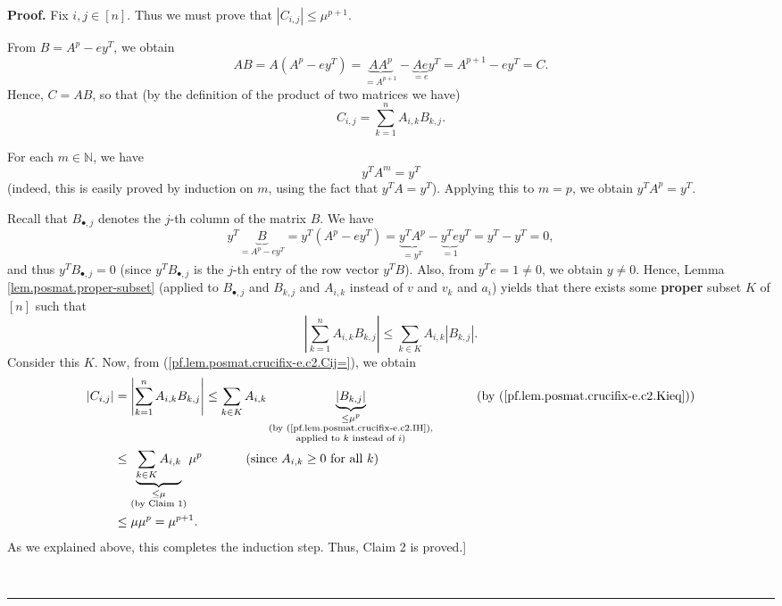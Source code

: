 \documentclass[numbers=enddot,12pt,final,onecolumn,notitlepage]{scrartcl}%
\numberwithin{exer}{subsection}
\theoremstyle{definition}
\newenvironment{proof}[1][Proof]{\noindent\textbf{#1.} }{\ \rule{0.5em}{0.5em}}
\let\sumnonlimits\sum
\renewcommand{\sum}{\sumnonlimits\limits}
\begin{document}
\begin{proof}
Fix $i,j\in\left[  n\right]  $. Thus we must prove that $\left\vert
C_{i,j}\right\vert \leq\mu^{p+1}$.

From $B=A^{p}-ey^{T}$, we obtain%
\[
AB=A\left(  A^{p}-ey^{T}\right)  =\underbrace{AA^{p}}_{=A^{p+1}}%
-\underbrace{Ae}_{=e}y^{T}=A^{p+1}-ey^{T}=C.
\]
Hence, $C=AB$, so that (by the definition of the product of two matrices we
have)%
\begin{equation}
C_{i,j}=\sum_{k=1}^{n}A_{i,k}B_{k,j}. \label{pf.lem.posmat.crucifix-e.c2.Cij=}%
\end{equation}


For each $m\in\mathbb{N}$, we have
\[
y^{T}A^{m}=y^{T}%
\]
(indeed, this is easily proved by induction on $m$, using the fact that
$y^{T}A=y^{T}$). Applying this to $m=p$, we obtain $y^{T}A^{p}=y^{T}$.

Recall that $B_{\bullet,j}$ denotes the $j$-th column of the matrix $B$. We
have%
\[
y^{T}\underbrace{B}_{=A^{p}-ey^{T}}=y^{T}\left(  A^{p}-ey^{T}\right)
=\underbrace{y^{T}A^{p}}_{=y^{T}}-\underbrace{y^{T}e}_{=1}y^{T}=y^{T}%
-y^{T}=0,
\]
and thus $y^{T}B_{\bullet,j}=0$ (since $y^{T}B_{\bullet,j}$ is the $j$-th
entry of the row vector $y^{T}B$). Also, from $y^{T}e=1\neq0$, we obtain
$y\neq0$. Hence, Lemma \ref{lem.posmat.proper-subset} (applied to
$B_{\bullet,j}$ and $B_{k,j}$ and $A_{i,k}$ instead of $v$ and $v_{k}$ and
$a_{i}$) yields that there exists some \textbf{proper} subset $K$ of $\left[
n\right]  $ such that%
\begin{equation}
\left\vert \sum_{k=1}^{n}A_{i,k}B_{k,j}\right\vert \leq\sum_{k\in K}%
A_{i,k}\left\vert B_{k,j}\right\vert .
\label{pf.lem.posmat.crucifix-e.c2.Kieq}%
\end{equation}
Consider this $K$. Now, from (\ref{pf.lem.posmat.crucifix-e.c2.Cij=}), we
obtain%
\begin{align*}
\left\vert C_{i,j}\right\vert  &  =\left\vert \sum_{k=1}^{n}A_{i,k}%
B_{k,j}\right\vert \leq\sum_{k\in K}A_{i,k}\underbrace{\left\vert
B_{k,j}\right\vert }_{\substack{\leq\mu^{p}\\\text{(by
(\ref{pf.lem.posmat.crucifix-e.c2.IH}),}\\\text{applied to }k\text{ instead of
}i\text{)}}}\ \ \ \ \ \ \ \ \ \ \left(  \text{by
(\ref{pf.lem.posmat.crucifix-e.c2.Kieq})}\right) \\
&  \leq\underbrace{\sum_{k\in K}A_{i,k}}_{\substack{\leq\mu\\\text{(by Claim
1)}}}\mu^{p}\ \ \ \ \ \ \ \ \ \ \left(  \text{since }A_{i,k}\geq0\text{ for
all }k\right) \\
&  \leq\mu\mu^{p}=\mu^{p+1}.
\end{align*}
As we explained above, this completes the induction step. Thus, Claim 2 is
proved.] \medskip


\end{proof}
\end{document}
